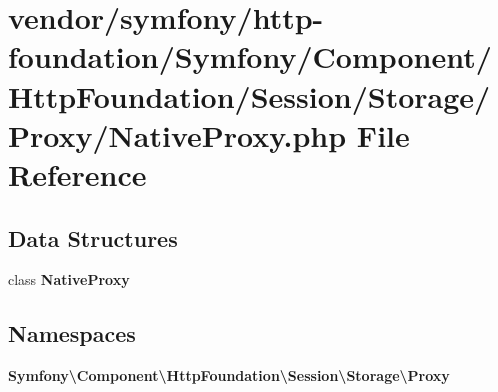 \section{vendor/symfony/http-\/foundation/\+Symfony/\+Component/\+Http\+Foundation/\+Session/\+Storage/\+Proxy/\+Native\+Proxy.php File Reference}
\label{_native_proxy_8php}
\subsection*{Data Structures}
\begin{DoxyCompactItemize}
\item 
class {\bf Native\+Proxy}
\end{DoxyCompactItemize}
\subsection*{Namespaces}
\begin{DoxyCompactItemize}
\item 
 {\bf Symfony\textbackslash{}\+Component\textbackslash{}\+Http\+Foundation\textbackslash{}\+Session\textbackslash{}\+Storage\textbackslash{}\+Proxy}
\end{DoxyCompactItemize}

